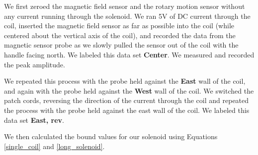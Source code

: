 We first zeroed the magnetic field sensor and the rotary motion sensor without any current running through the solenoid. We ran 5V of DC current through the coil, inserted the magnetic field sensor as far as possible into the coil (while centered about the vertical axis of the coil), and recorded the data from the magnetic sensor probe as we slowly pulled the sensor out of the coil with the handle facing north. We labeled this data set \textbf{Center}. We measured and recorded the peak amplitude.

\bigskip
We repeated this process with the probe held against the \textbf{East} wall of the coil, and again with the probe held against the \textbf{West} wall of the coil. We switched the patch cords, reversing the direction of the current through the coil and repeated the process with the probe held against the east wall of the coil. We labeled this data set \textbf{East, rev}.

\bigskip
We then calculated the bound values for our solenoid using Equations \ref{single_coil} and \ref{long_solenoid}.
